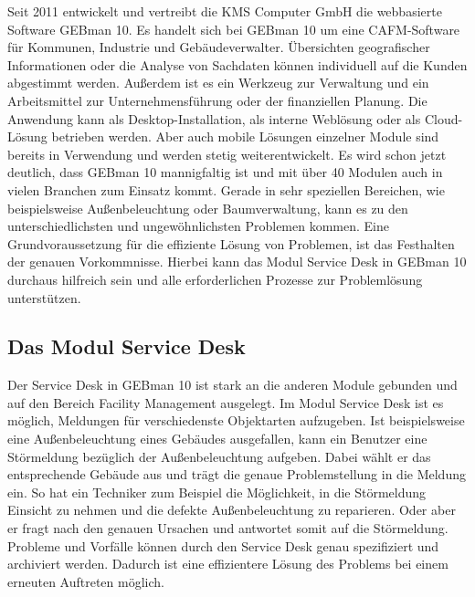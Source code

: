 \noindent
Seit 2011 entwickelt und vertreibt die KMS Computer GmbH die webbasierte Software GEBman 10. Es handelt sich bei GEBman 10 um eine CAFM-Software für Kommunen, Industrie und Gebäudeverwalter. Übersichten geografischer Informationen oder die Analyse von Sachdaten können individuell auf die Kunden abgestimmt werden. Außerdem ist es ein Werkzeug zur Verwaltung und ein Arbeitsmittel zur Unternehmensführung oder der finanziellen Planung. Die Anwendung kann als Desktop-Installation, als interne Weblösung oder als Cloud-Lösung betrieben werden. Aber auch mobile Lösungen einzelner Module sind bereits in Verwendung und werden stetig weiterentwickelt. Es wird schon jetzt deutlich, dass GEBman 10 mannigfaltig ist und mit über 40 Modulen auch in vielen Branchen zum Einsatz kommt. Gerade in sehr speziellen Bereichen, wie beispielsweise Außenbeleuchtung oder Baumverwaltung, kann es zu den unterschiedlichsten und ungewöhnlichsten Problemen kommen. Eine Grundvoraussetzung  für die effiziente Lösung von Problemen, ist das Festhalten der genauen Vorkommnisse. Hierbei kann das Modul Service Desk in GEBman 10 durchaus hilfreich sein und alle erforderlichen Prozesse zur Problemlösung unterstützen.



\subsection{Das Modul Service Desk}
\noindent
Der Service Desk in GEBman 10 ist stark an die anderen Module gebunden und auf den Bereich Facility Management ausgelegt. Im Modul Service Desk ist es möglich, Meldungen für verschiedenste Objektarten aufzugeben. Ist beispielsweise eine Außenbeleuchtung eines Gebäudes ausgefallen, kann ein Benutzer eine Störmeldung bezüglich der Außenbeleuchtung aufgeben. Dabei wählt er das entsprechende Gebäude aus und trägt die genaue Problemstellung in die Meldung ein. So hat ein Techniker zum Beispiel die Möglichkeit, in die Störmeldung Einsicht zu nehmen und die defekte Außenbeleuchtung zu reparieren. Oder aber er fragt nach den genauen Ursachen und antwortet somit auf die Störmeldung. Probleme und Vorfälle können durch den Service Desk genau spezifiziert und archiviert werden. Dadurch ist eine effizientere Lösung des Problems bei einem erneuten Auftreten möglich.\\


